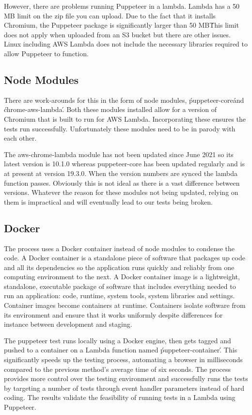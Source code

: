 \documentclass[12pt,a4paper,titlepage]{report}
\begin{document}
However, there are problems running Puppeteer in a lambda. Lambda has a 50 MB limit on the zip file you can upload. Due to the fact that it installs Chromium, the Puppeteer package is significantly larger than 50 MB\. This limit does not apply when uploaded from an S3 bucket but there are other issues. Linux including AWS Lambda does not include the necessary libraries required to allow Puppeteer to function.

\subsection{Node Modules}

There are work-arounds for this in the form of node modules, \'puppeteer-core\' and \'chrome-aws-lambda\'.
Both these modules installed allow for a version of Chromium that is built to run for AWS Lambda. Incorporating
these ensures the tests run successfully. Unfortunately these modules need to be in parody with each other.

The aws-chrome-lambda module has not been updated since June 2021 so its latest version is 10.1.0 whereas
puppeteer-core has been updated regularly and is at present at version 19.3.0. When the version numbers are
synced the lambda function passes. Obviously this is not ideal as there is a vast difference between versions.
Whatever the reason for these modules not being updated, relying on them is impractical and will eventually lead to our tests being broken.

\subsection{Docker}

The process uses a Docker container instead of node modules to condense the code. A Docker
container is a standalone piece of software that packages up code and all its dependencies so the application runs quickly and reliably from one computing environment to the next.
A Docker container image is a lightweight, standalone, executable package of software that includes everything needed to run an application: code, runtime, system tools, system libraries and settings.
Container images become containers at runtime. Containers isolate software from its environment and ensure that it works uniformly despite differences for instance between development and staging.

The puppeteer test runs locally using a Docker engine, then gets tagged and pushed to a container on a Lambda function named \'puppeteer-container\'.
This significantly speeds up the testing process, automating a browser in milliseconds compared to the previous method's average time of six seconds.
The process provides more control over the testing environment and successfully runs the tests by targeting a number of tests through event handler parameters instead of hard coding.
The results validate the feasibility of running tests in a Lambda using Puppeteer.
\end{document}
